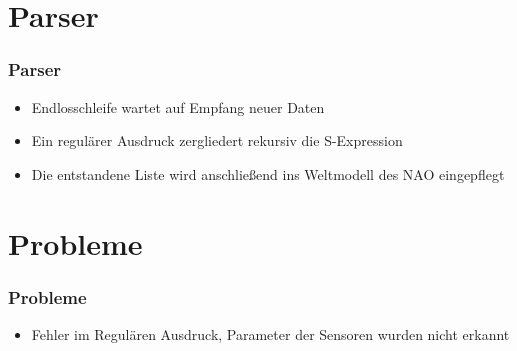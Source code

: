 \section{Parser}
\frame
{
  \frametitle{Parser}
  
  \begin{itemize}[<+->]
    \item Endlosschleife wartet auf Empfang neuer Daten
    \item Ein regul\"arer Ausdruck zergliedert rekursiv die S-Expression\\
    
    \item Die entstandene Liste wird anschlie{\ss}end ins Weltmodell des NAO eingepflegt
  \end{itemize}
}

\section{Probleme}
\frame
{
  \frametitle{Probleme}
  
  \begin{itemize}
    \item Fehler im Regul\"aren Ausdruck, Parameter der Sensoren wurden nicht erkannt
  \end{itemize}
}
